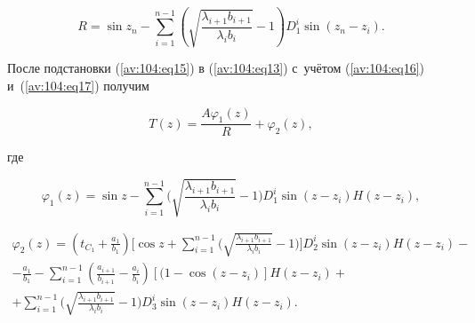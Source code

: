 \begin{equation}

\label{av:104:eq17}

R=\sin z_n -\sum\limits_{i=1}^{n-1} {\left( {\sqrt {\frac{\lambda _{i+1}

b_{i+1} }{\lambda _i b_i }} -1} \right)} D_1^i \sin (z_n -z_i ).

\end{equation}



После подстановки (\ref{av:104:eq15}) в (\ref{av:104:eq13}) с~учётом (\ref{av:104:eq16}) и~(\ref{av:104:eq17}) получим

\begin{equation}

\label{av:104:eq18}

T(z)=\frac{A\varphi _1 (z)}{R}+\varphi _2 (z),

\end{equation}

где

\[

\varphi _1 (z)=\sin z-\sum\limits_{i=1}^{n-1}

\biggl( \sqrt {\frac{\lambda _{i+1} b_{i+1} }{\lambda _i b_i }} -1 \biggr) D_1^i \sin (z-z_i )H(z-z_i),

\]

\begin{multline*}

\varphi _2 (z)=\left( t_{C_1 } +\frac{a_1 }{b_1 } \right)

\biggl[ \cos z+

\sum\limits_{i=1}^{n-1} \biggl(

\sqrt {\frac{\lambda _{i+1} b_{i+1}}{\lambda _i b_i }} -1 \biggr) \biggr] D_2^i

\sin (z-z_i )H(z-z_i ) -

\\

 -\frac{a_1 }{b_1 }-

\sum\limits_{i=1}^{n-1} \left( \frac{a_{i+1} }{b_{i+1}

}-\frac{a_i }{b_i } \right) [ (1-\cos (z-z_i ) ] H(z-z_i )+

\\

 +\sum\limits_{i=1}^{n-1} \biggl( \sqrt {\frac{\lambda _{i+1} b_{i+1}

}{\lambda _i b_i } } -1 \biggr)   D_3^i \sin (z-z_i )H(z-z_i ).

 \end{multline*}



